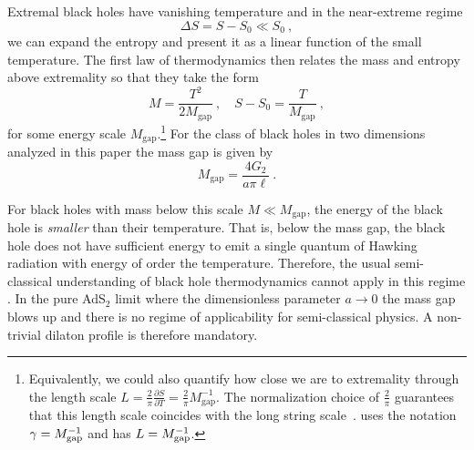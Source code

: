 \documentclass[12pt]{article}
\begin{document}
Extremal black holes have vanishing temperature and in the near-extreme regime 
\begin{equation}
	\Delta S = S - S_0 \ll S_0  ~,
	\label{eqn:nearextS}
\end{equation}
we can expand the entropy and present it as a linear function of the small temperature. 
The first law of thermodynamics then relates the mass and entropy above extremality so that they take the form
\begin{equation}
	M  = \frac{T^2}{2M_\text{gap}}~, \quad S - S_0 = \frac{T}{M_\text{gap}}~,
\label{eq:above_ext}
\end{equation}
for some energy scale $M_\text{gap}$.\footnote{Equivalently, we could also quantify how close we are to extremality through the length scale $L =  \frac{2}{\pi} \frac{\partial S}{\partial T} = \frac{2}{\pi}M_\text{gap}^{-1}$.  The normalization choice of $\frac{2}{\pi}$ guarantees that this length scale coincides with the long string scale~\cite{Larsen:2018iou}. \cite{Sachdev:2019bjn} uses the notation $\gamma=M^{-1}_{\rm gap}$ and \cite{Hong:2019tsx} has $L=M^{-1}_{\rm gap}$. }   For the class of black holes in two dimensions analyzed in this paper the mass gap is given by
\begin{equation}
	M_\text{gap} = \frac{4 G_2}{a \pi \ell}~.
\end{equation}

For black holes with mass below this scale $M \ll M_\text{gap}$, the energy of the black hole is \emph{smaller} than their temperature.  That is, below the mass gap, the black hole does not have sufficient energy to emit a single quantum of Hawking radiation with energy of order the temperature.  Therefore, the usual semi-classical understanding of black hole thermodynamics cannot apply in this regime \cite{Preskill:1991tb}.  In the pure AdS$_2$ limit where the dimensionless parameter $a \to 0$ the mass gap blows up and there is no regime of applicability for semi-classical physics.  A non-trivial dilaton profile is therefore mandatory. 
\end{document}
